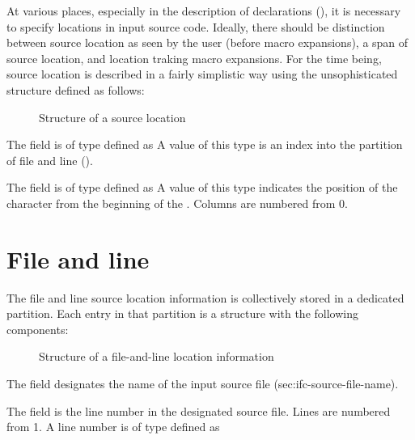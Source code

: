 \label{sec:ifc-source-location}

At various places, especially in the description of declarations (), it is necessary to specify 
locations in input source code.  Ideally, there should be distinction between source location as seen by the
user (before macro expansions), a span of source location, and location traking macro expansions.
For the time being, source location is described in a fairly simplistic way using the unsophisticated
structure  defined as follows:
%
\begin{figure}[h]
	\centering
	\caption{Structure of a source location}
	\label{fig:ifc-source-location-structure}
\end{figure}


\noindent
The  field is of type  defined as 
A value of this type is an index into the partition of file and line ().

\noindent
The  field is of type  defined as 
A value of this type indicates the position of the character from the beginning of the .
Columns are numbered from 0.

\section{File and line}
\label{sec:ifc-file-and-line-location}

The file and line source location information is collectively stored in a dedicated partition.
Each entry in that partition is a structure with the following components:
%
\begin{figure}[h]
	\centering
	\caption{Structure of a file-and-line location information}
	\label{fig:ifc-file-and-line-structure}
\end{figure}
%
The  field designates the name of the input source file (sec:ifc-source-file-name).

\noindent
The  field is the line number in the designated source file. Lines are numbered from 1.
A line number is of type  defined as 

